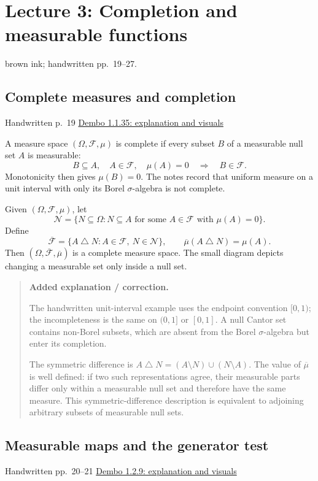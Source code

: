 \documentclass[11pt,letterpaper]{article}
\newcommand{\lecturesection}[1]{\subsection{#1}}
\begin{document}
\clearpage
{}
\section{Lecture 3: Completion and measurable functions}
{\small brown ink; handwritten pp.\ 19--27.}

\hypertarget{l3-s1}{}
\lecturesection{Complete measures and completion}
{\small\textcolor{lectureink}{Handwritten p.\ 19} \quad \href{https://josephrbailey.com/probability/\#entry-1-1-35}{Dembo 1.1.35: explanation and visuals}}

A measure space $(\Omega,\mathcal F,\mu)$ is complete if every subset $B$ of a measurable null set $A$ is measurable: \[B\subseteq A,\quad A\in\mathcal F,\quad\mu(A)=0\quad\Longrightarrow\quad B\in\mathcal F.\] Monotonicity then gives $\mu(B)=0$. The notes record that uniform measure on a unit interval with only its Borel $\sigma$-algebra is not complete.

Given $(\Omega,\mathcal F,\mu)$, let \[\mathcal N=\{N\subseteq\Omega:N\subseteq A\text{ for some }A\in\mathcal F\text{ with }\mu(A)=0\}.\] Define \[\overline{\mathcal F}=\{A\mathbin{\triangle}N:A\in\mathcal F,\ N\in\mathcal N\},\qquad\overline\mu(A\mathbin{\triangle}N)=\mu(A).\] Then $(\Omega,\overline{\mathcal F},\overline\mu)$ is a complete measure space. The small diagram depicts changing a measurable set only inside a null set.

\begin{quote}\small\textbf{Added explanation / correction.}

The handwritten unit-interval example uses the endpoint convention $[0,1)$; the incompleteness is the same on $(0,1]$ or $[0,1]$. A null Cantor set contains non-Borel subsets, which are absent from the Borel $\sigma$-algebra but enter its completion.

The symmetric difference is $A\mathbin{\triangle}N=(A\setminus N)\cup(N\setminus A)$. The value of $\overline\mu$ is well defined: if two such representations agree, their measurable parts differ only within a measurable null set and therefore have the same measure. This symmetric-difference description is equivalent to adjoining arbitrary subsets of measurable null sets.
\end{quote}

\hypertarget{l3-s2}{}
\lecturesection{Measurable maps and the generator test}
{\small\textcolor{lectureink}{Handwritten pp.\ 20--21} \quad \href{https://josephrbailey.com/probability/\#entry-1-2-9}{Dembo 1.2.9: explanation and visuals}}
\end{document}
